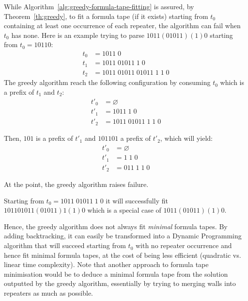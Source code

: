 \begin{remark}
    While Algorithm~\ref{alg:greedy-formula-tape-fitting} is assured, by Theorem~\ref{th:greedy},  to fit a formula tape (if it exists) starting from $t_0$ containing at least one occurrence of each repeater, the algorithm can fail when $t_0$ has none. Here is an example trying to parse $1011(01011)(1)0$ starting from $t_0 = 10110$:
    \begin{align*}
        t_0 & = 1011\; 0                         \\
        t_1 & = 1011\; 01011\; 1\; 0             \\
        t_2 & = 1011\; 01011\; 01011\; 1\; 1\; 0
    \end{align*}
    The greedy algorithm reach the following configuration by consuming $t_0$ which is a prefix of $t_1$ and $t_2$:
    \begin{align*}
        t'_0 & = \varnothing              \\
        t'_1 & = 1011\; 1\; 0             \\
        t'_2 & = 1011\; 01011\; 1\; 1\; 0
    \end{align*}

    Then, $101$ is a prefix of $t'_1$ and $101 101$ a prefix of $t'_2$, which will yield:
    \begin{align*}
        t'_0 & = \varnothing     \\
        t'_1 & = 1\; 1\; 0       \\
        t'_2 & = 011\; 1\; 1\; 0
    \end{align*}

    At the point, the greedy algorithm raises failure.

    Starting from $t_0 = 1011\; 01011\; 1\; 0$ it will successfully fit $101101011(01011)1(1)0$ which is a special case of $1011(01011)(1)0$.

    Hence, the greedy algorithm does not always fit \textit{minimal} formula tapes. By adding backtracking, it can easily be transformed into a Dynamic Programming algorithm that will succeed starting from $t_0$ with no repeater occurrence and hence fit minimal formula tapes, at the cost of being less efficient (quadratic vs. linear time complexity).
    Note that another approach to formula tape minimisation would be to deduce a minimal formula tape from the solution outputted by the greedy algorithm, essentially by trying to merging walls into repeaters as much as possible.

\end{remark}
